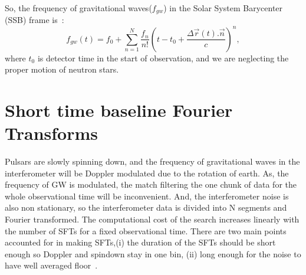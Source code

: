 \documentclass{ttuthes2007}
\begin{document}
So, the frequency of gravitational waves($f_{gw}$) in the Solar System Barycenter
(SSB) frame is~\cite{Krishnan_2004}:
\begin{equation}
f_{gw}(t) = f_0 + \sum_{n=1}^{N} \frac{f_n}{n!}\left(t - t_0 + \frac{\Delta
\vec{r}(t). \vec{n}}{c}\right)^n,
\end{equation}
where $t_0$ is detector time in the start of observation, and we are
neglecting the proper motion of neutron stars. 

\section{Short time baseline Fourier Transforms}
Pulsars are slowly spinning down, and the frequency of gravitational waves
in the interferometer will be Doppler modulated due to the rotation of earth.
As, the frequency of \ac{GW} is modulated, the match filtering the one chunk of
data for the whole observational time will be inconvenient. And, the
interferometer noise is also non stationary, so the interferometer data is 
divided into N segments and Fourier transformed. The computational cost of the
search increases linearly with the number of \acp{SFT} for a fixed observational
time. There are two main points accounted for in making \acp{SFT},(i) the
duration of the
\acp{SFT} should be short enough so Doppler and spindown stay in one bin, (ii)
long enough for the noise to have well averaged floor~\cite{Krishnan_2004,Abbott_2007}. 
\end{document}

